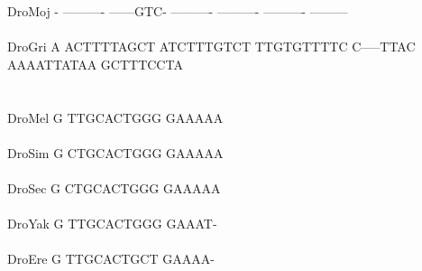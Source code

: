\documentclass[11pt,twoside,reqno,a4paper]{article}
\begin{document}
{DroMoj	-	----------	------GTC-	----------	----------	----------	---------\\
\hspace*{7\charwidth}\hspace*{1\charwidth}\hspace*{1\charwidth}\hspace*{1\charwidth}\hspace*{1\charwidth}\hspace*{1\charwidth}\hspace*{1\charwidth}\\
DroGri	A	ACTTTTAGCT	ATCTTTGTCT	TTGTGTTTTC	C-----TTAC	AAAATTATAA	GCTTTCCTA\\
\hspace*{7\charwidth}\hspace*{1\charwidth}\hspace*{1\charwidth}\hspace*{1\charwidth}\hspace*{1\charwidth}\hspace*{1\charwidth}\hspace*{1\charwidth}\\
\\
DroMel	G	TTGCACTGGG	GAAAAA\\
\hspace*{7\charwidth}\hspace*{1\charwidth}\hspace*{1\charwidth}\\
DroSim	G	CTGCACTGGG	GAAAAA\\
\hspace*{7\charwidth}\hspace*{1\charwidth}\hspace*{1\charwidth}\\
DroSec	G	CTGCACTGGG	GAAAAA\\
\hspace*{7\charwidth}\hspace*{1\charwidth}\hspace*{1\charwidth}\\
DroYak	G	TTGCACTGGG	GAAAT-\\
\hspace*{7\charwidth}\hspace*{1\charwidth}\hspace*{1\charwidth}\\
DroEre	G	TTGCACTGCT	GAAAA-\\
\hspace*{7\charwidth}\hspace*{1\charwidth}\hspace*{1\charwidth}\\
}
\end{document}
